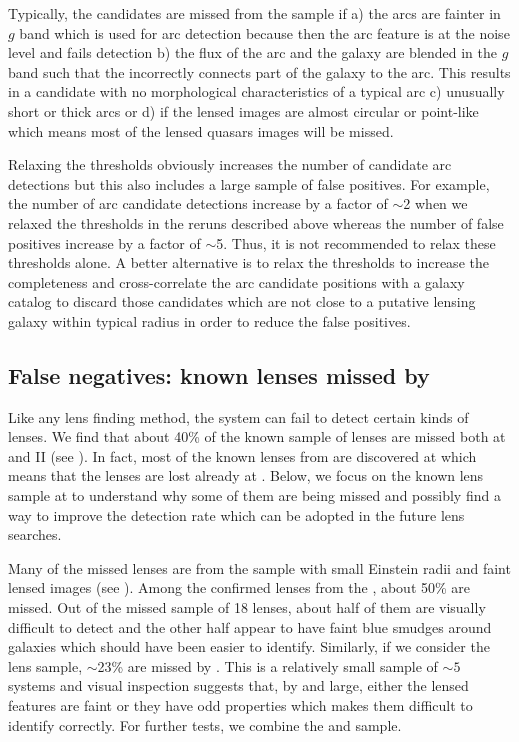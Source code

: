 \documentclass[useAMS,usenatbib,a4paper]{mn2e}
\begin{document}
Typically, the candidates are missed from the \af sample if a) the arcs
are fainter in $g$ band which is used for arc detection because then the
arc feature is at the noise level and fails detection b) the flux of the
arc and the galaxy are blended in the $g$ band such that the \af
incorrectly connects part of the galaxy to the arc. This results in a
candidate with no morphological characteristics of a typical arc c)
unusually short or thick arcs or d) if the lensed images are almost
circular or point-like which means most of the lensed quasars images
will be missed. 

Relaxing the thresholds obviously increases the number of candidate arc
detections but this also includes a large sample of false positives.
For example, the number of arc candidate detections increase by a factor
of $\sim$2 when we relaxed the thresholds in the reruns described above
whereas the number of false positives increase by a factor of $\sim$5.
Thus, it is not recommended to relax these thresholds alone. A better
alternative is to relax the thresholds to increase the completeness and
cross-correlate the arc candidate positions with a galaxy catalog to
discard those candidates which are not close to a putative lensing
galaxy within typical radius in order to reduce the false positives.




\subsection{False negatives: known lenses missed by \sw}
\label{sec:fn}
Like any lens finding method, the \sw system can fail to detect certain
kinds of lenses.  We find that about 40\% of the known sample of lenses
are missed both at \StageOne and II (see ). In fact, most
of the known lenses from \StageOne are discovered at \StageTwo which
means that the lenses are lost already at \StageOne. Below, we focus on the known
lens sample at \StageOne to understand why some of them are being missed
and possibly find a way to improve the detection rate which can be
adopted in the future \sw lens searches.

Many of the missed lenses are from the \rf sample with small
Einstein radii and faint lensed images (see ). Among
the confirmed lenses from the \rf, about 50\% are missed. Out of the
missed sample of 18 lenses, about half of them are visually difficult to
detect and the other half appear to have faint blue smudges around
galaxies which should have been easier to identify. Similarly,
if we consider the \af lens sample, $\sim$23\% are missed by \sw. This
is a relatively small sample of $\sim 5$ systems and visual inspection
suggests that, by and large, either the lensed features are faint
or they have odd properties which makes them difficult to identify
correctly. For further tests, we combine the \rf and \af sample.
\end{document}
